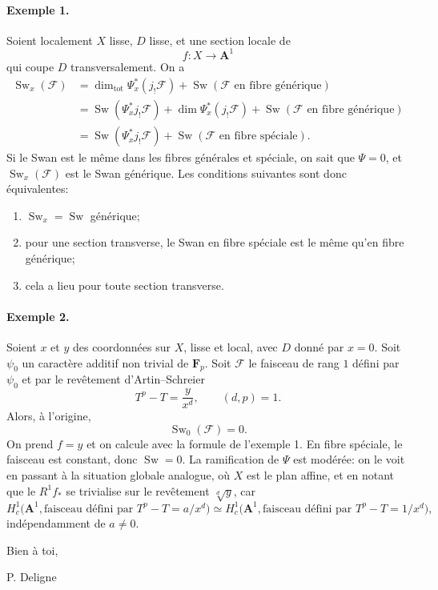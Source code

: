 \documentclass[11pt]{article}
\newcommand{\F}{\mathcal F}
\newcommand{\Fp}{\mathbf F_p}
\newcommand{\A}{\mathbf A}
\DeclareMathOperator{\Sw}{Sw}
\DeclareMathOperator{\Tot}{tot}
\begin{document}
\paragraph{Exemple 1.}
Soient localement \(X\) lisse, \(D\) lisse, et une section locale de
\[
  f:X\longrightarrow \A^1
\]
qui coupe \(D\) transversalement. On a
\[
\begin{aligned}
\Sw_x(\F)
&=\dim_{\Tot}\Psi_x^*(j_!\F)
  +\Sw(\F\text{ en fibre générique}) \\
&=\Sw(\Psi_x^*j_!\F)
  +\dim\Psi_x^*(j_!\F)
  +\Sw(\F\text{ en fibre générique}) \\
&=\Sw(\Psi_x^*j_!\F)+\Sw(\F\text{ en fibre spéciale}).
\end{aligned}
\]
Si le Swan est le même dans les fibres générales et spéciale, on sait que \(\Psi=0\), et \(\Sw_x(\F)\) est le Swan générique. Les conditions suivantes sont donc équivalentes:
\begin{enumerate}[label=(\roman*)]
\item \(\Sw_x=\Sw\) générique;
\item pour une section transverse, le Swan en fibre spéciale est le même qu'en fibre générique;
\item cela a lieu pour toute section transverse.
\end{enumerate}

\paragraph{Exemple 2.}
Soient \(x\) et \(y\) des coordonnées sur \(X\), lisse et local, avec \(D\) donné par \(x=0\). Soit \(\psi_0\) un caractère additif non trivial de \(\Fp\). Soit \(\F\) le faisceau de rang \(1\) défini par \(\psi_0\) et par le revêtement d'Artin--Schreier
\[
  T^p-T=\frac{y}{x^d},
  \qquad (d,p)=1.
\]
Alors, à l'origine,
\[
  \Sw_0(\F)=0.
\]
On prend \(f=y\) et on calcule avec la formule de l'exemple 1. En fibre spéciale, le faisceau est constant, donc \(\Sw=0\). La ramification de \(\Psi\) est modérée: on le voit en passant à la situation globale analogue, où \(X\) est le plan affine, et en notant que le \(R^1f_*\) se trivialise sur le revêtement \(\sqrt[d]{y}\), car
\[
 H_c^1\bigl(\A^1,\text{faisceau défini par }T^p-T=a/x^d\bigr)
 \simeq
 H_c^1\bigl(\A^1,\text{faisceau défini par }T^p-T=1/x^d\bigr),
\]
indépendamment de \(a\ne 0\).

Bien à toi,

\hspace{2em}P. Deligne
\end{document}
